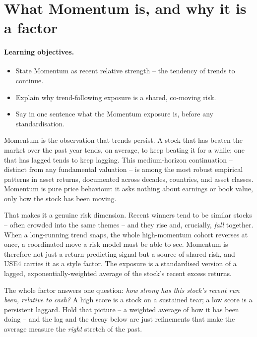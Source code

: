 \documentclass[11pt]{article}
\theoremstyle{definition}
\theoremstyle{plain}
\theoremstyle{remark}
\begin{document}
\tableofcontents
\bigskip

\section{What Momentum is, and why it is a factor}\label{sec:what}

\paragraph{Learning objectives.}
\begin{itemize}[leftmargin=1.4em,topsep=2pt]
  \item State Momentum as recent relative strength -- the tendency of trends to continue.
  \item Explain why trend-following exposure is a shared, co-moving risk.
  \item Say in one sentence what the Momentum exposure is, before any standardisation.
\end{itemize}

Momentum is the observation that trends persist. A stock that has beaten the market over the past year tends, on average, to keep beating it for a while; one that has lagged tends to keep lagging. This medium-horizon continuation -- distinct from any fundamental valuation -- is among the most robust empirical patterns in asset returns, documented across decades, countries, and asset classes. Momentum is pure price behaviour: it asks nothing about earnings or book value, only how the stock has been moving.

That makes it a genuine risk dimension. Recent winners tend to be similar stocks -- often crowded into the same themes -- and they rise and, crucially, \emph{fall} together. When a long-running trend snaps, the whole high-momentum cohort reverses at once, a coordinated move a risk model must be able to see. Momentum is therefore not just a return-predicting signal but a source of shared risk, and USE4 carries it as a style factor. The exposure is a standardised version of a lagged, exponentially-weighted average of the stock's recent excess returns.

\begin{intuition}
The whole factor answers one question: \emph{how strong has this stock's recent run been, relative to cash?} A high score is a stock on a sustained tear; a low score is a persistent laggard. Hold that picture -- a weighted average of how it has been doing -- and the lag and the decay below are just refinements that make the average measure the \emph{right} stretch of the past.
\end{intuition}
\end{document}
